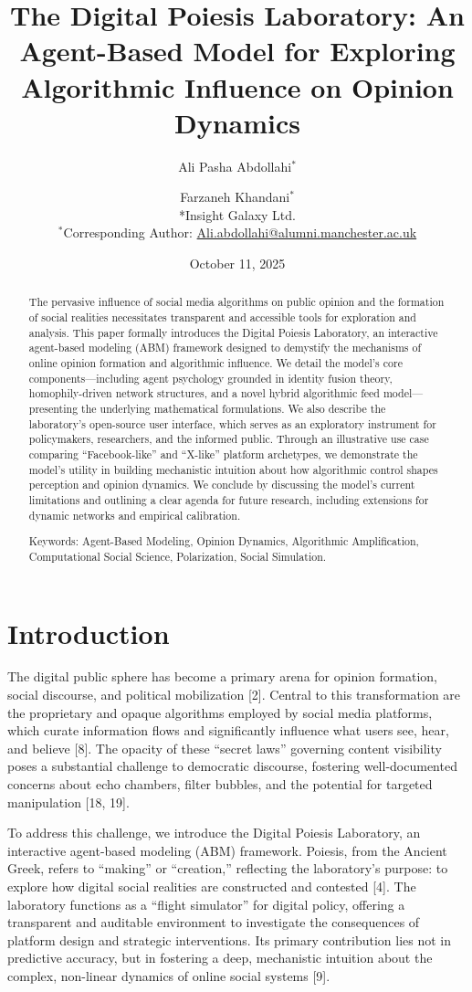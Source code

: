 \documentclass[11pt]{article}
\title{The Digital Poiesis Laboratory: An Agent-Based Model for Exploring Algorithmic Influence on Opinion Dynamics}
\author{Ali Pasha Abdollahi$^{*}$ \and Farzaneh Khandani$^{*}$ \\
*Insight Galaxy Ltd.\\
$^*$Corresponding Author: \href{mailto:Ali.abdollahi@alumni.manchester.ac.uk}{Ali.abdollahi@alumni.manchester.ac.uk}}
\date{October 11, 2025}
\begin{document}
\maketitle

\begin{abstract}
The pervasive influence of social media algorithms on public opinion and the formation of social realities necessitates transparent and accessible tools for exploration and analysis. This paper formally introduces the Digital Poiesis Laboratory, an interactive agent-based modeling (ABM) framework designed to demystify the mechanisms of online opinion formation and algorithmic influence. We detail the model’s core components—including agent psychology grounded in identity fusion theory, homophily-driven network structures, and a novel hybrid algorithmic feed model—presenting the underlying mathematical formulations. We also describe the laboratory’s open-source user interface, which serves as an exploratory instrument for policymakers, researchers, and the informed public. Through an illustrative use case comparing ``Facebook-like'' and ``X-like'' platform archetypes, we demonstrate the model’s utility in building mechanistic intuition about how algorithmic control shapes perception and opinion dynamics. We conclude by discussing the model’s current limitations and outlining a clear agenda for future research, including extensions for dynamic networks and empirical calibration.

Keywords: Agent-Based Modeling, Opinion Dynamics, Algorithmic Amplification, Computational Social Science, Polarization, Social Simulation.
\end{abstract}

\section{Introduction}

The digital public sphere has become a primary arena for opinion formation, social discourse, and political mobilization [2]. Central to this transformation are the proprietary and opaque algorithms employed by social media platforms, which curate information flows and significantly influence what users see, hear, and believe [8]. The opacity of these ``secret laws'' governing content visibility poses a substantial challenge to democratic discourse, fostering well-documented concerns about echo chambers, filter bubbles, and the potential for targeted manipulation [18, 19].

To address this challenge, we introduce the Digital Poiesis Laboratory, an interactive agent-based modeling (ABM) framework. Poiesis, from the Ancient Greek, refers to ``making'' or ``creation,'' reflecting the laboratory’s purpose: to explore how digital social realities are constructed and contested [4]. The laboratory functions as a ``flight simulator'' for digital policy, offering a transparent and auditable environment to investigate the consequences of platform design and strategic interventions. Its primary contribution lies not in predictive accuracy, but in fostering a deep, mechanistic intuition about the complex, non-linear dynamics of online social systems [9].
\end{document}
